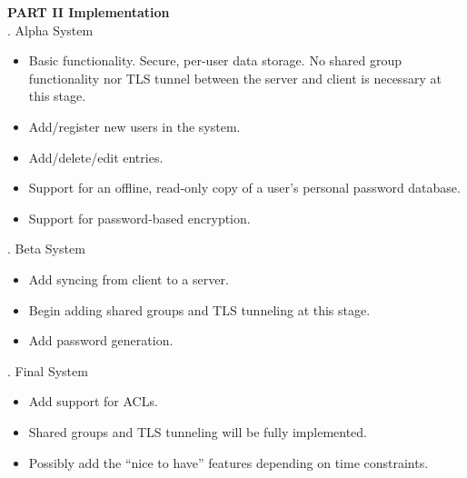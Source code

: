 \documentclass[11pt, letterpaper]{article}
\newcommand{\DesignSection}[1]
{\noindent\textbf{#1}\\}
\begin{document}
\DesignSection{PART II Implementation}
. Alpha System
\begin{itemize} \itemsep1pt \parskip0pt 
\item Basic functionality. Secure, per-user data storage. No shared group functionality nor TLS tunnel between the server and client is necessary at this stage.
\item Add/register new users in the system.
\item Add/delete/edit entries.
\item Support for an offline, read-only copy of a user’s personal password database.
\item Support for password-based encryption.
\end{itemize}
. Beta System
\begin{itemize} \itemsep1pt \parskip0pt 
\item Add syncing from client to a server.
\item Begin adding shared groups and TLS tunneling at this stage.
\item Add password generation.
\end{itemize}
. Final System
\begin{itemize} \itemsep1pt \parskip0pt 
\item Add support for ACLs.
\item Shared groups and TLS tunneling will be fully implemented.
\item Possibly add the “nice to have” features depending on time constraints.
\end{itemize}
\end{document}

